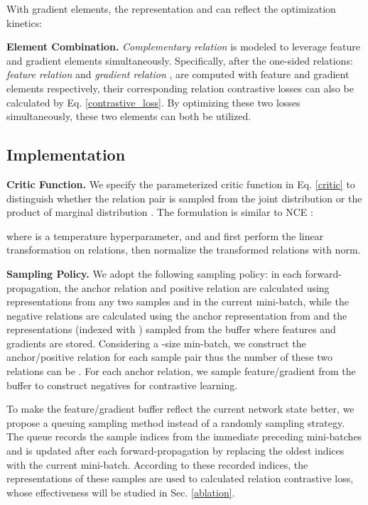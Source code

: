 \documentclass[final]{cvpr}
\begin{document}
With gradient elements, the representation  and  can reflect the optimization kinetics:


\noindent \textbf{Element Combination.}
\textit{Complementary relation} is modeled to  leverage feature and gradient elements simultaneously.
Specifically,
after  the one-sided relations: \textit{feature relation}  and \textit{gradient relation}  , are computed with   feature and gradient elements respectively, their corresponding relation contrastive losses can also be calculated by Eq. \ref{contrastive_loss}.
By optimizing these two losses simultaneously, these two elements can both be utilized.




\subsection{Implementation}
\noindent \textbf{Critic Function.} We specify the parameterized critic function  in Eq. \ref{critic} to  distinguish whether the relation pair  is sampled from the joint distribution  or the product of marginal distribution .  The formulation is similar to NCE \cite{wu2018unsupervised}:

where  is a temperature hyperparameter, and  and  first perform the linear transformation on relations, then normalize the transformed relations with  norm.




\noindent \textbf{Sampling Policy.} We adopt the following sampling policy:  in each forward-propagation, the anchor relation  and positive relation  are calculated using representations from any two samples  and  
in the current mini-batch, while the negative relations  are calculated using the anchor representation from  and the representations (indexed with ) sampled from the buffer   where features and gradients are stored. 
Considering a -size min-batch, we construct the anchor/positive relation for each sample pair 
thus the number of these two relations can be . For each anchor relation, we sample  feature/gradient from the buffer to construct  negatives for contrastive learning.  

To make the feature/gradient buffer reflect the current network state better, we propose a queuing sampling method instead of a randomly sampling strategy. The queue records the  sample indices from the immediate preceding mini-batches and is updated  after each forward-propagation by replacing the oldest indices with the current mini-batch. According to these recorded indices, the representations of these samples are
used to calculated relation contrastive loss, 
whose effectiveness will be
studied in Sec. \ref{ablation}.
\end{document}
